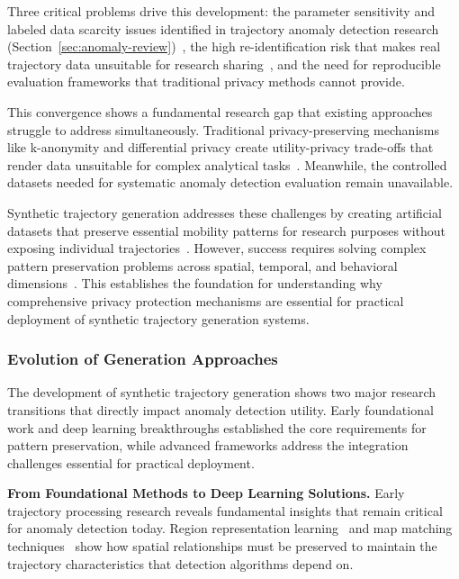 \documentclass[runningheads]{llncs}
\begin{document}
Three critical problems drive this development: the parameter sensitivity and labeled data scarcity issues identified in trajectory anomaly detection research (Section~\ref{sec:anomaly-review})~\cite{zhang2019ibat}, the high re-identification risk that makes real trajectory data unsuitable for research sharing~\cite{rao2023cats}, and the need for reproducible evaluation frameworks that traditional privacy methods cannot provide.

This convergence shows a fundamental research gap that existing approaches struggle to address simultaneously. Traditional privacy-preserving mechanisms like k-anonymity and differential privacy create utility-privacy trade-offs that render data unsuitable for complex analytical tasks~\cite{jordon2019pate}. Meanwhile, the controlled datasets needed for systematic anomaly detection evaluation remain unavailable.

Synthetic trajectory generation addresses these challenges by creating artificial datasets that preserve essential mobility patterns for research purposes without exposing individual trajectories~\cite{cao2021generating}. However, success requires solving complex pattern preservation problems across spatial, temporal, and behavioral dimensions~\cite{kong2023mobility,merhi2024synthetic}. This establishes the foundation for understanding why comprehensive privacy protection mechanisms are essential for practical deployment of synthetic trajectory generation systems.

\subsubsection{Evolution of Generation Approaches}

The development of synthetic trajectory generation shows two major research transitions that directly impact anomaly detection utility. Early foundational work and deep learning breakthroughs established the core requirements for pattern preservation, while advanced frameworks address the integration challenges essential for practical deployment.

\textbf{From Foundational Methods to Deep Learning Solutions.} Early trajectory processing research reveals fundamental insights that remain critical for anomaly detection today. Region representation learning~\cite{wang2017region} and map matching techniques~\cite{newson2009hidden} show how spatial relationships must be preserved to maintain the trajectory characteristics that detection algorithms depend on.
\end{document}
